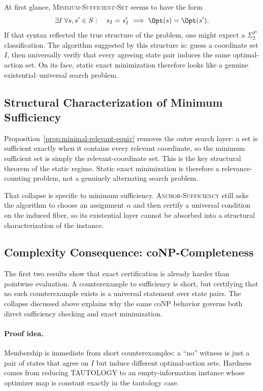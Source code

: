 At first glance, \textsc{Minimum-Sufficient-Set} seems to have the form
\[
\exists I\; \forall s,s'\in S:
\quad s_I=s'_I \implies \Opt(s)=\Opt(s').
\]
If that syntax reflected the true structure of the problem, one might expect a $\Sigma_2^P$ classification. The algorithm suggested by this structure is: guess a coordinate set $I$, then universally verify that every agreeing state pair induces the same optimal-action set. On its face, static exact minimization therefore looks like a genuine existential--universal search problem.

\subsection{Structural Characterization of Minimum Sufficiency}

Proposition~\ref{prop:minimal-relevant-equiv} removes the outer search layer: a set is sufficient exactly when it contains every relevant coordinate, so the minimum sufficient set is simply the relevant-coordinate set. This is the key structural theorem of the static regime. Static exact minimization is therefore a relevance-counting problem, not a genuinely alternating search problem.

That collapse is specific to minimum sufficiency. \textsc{Anchor-Sufficiency} still asks the algorithm to choose an assignment $\alpha$ and then certify a universal condition on the induced fiber, so its existential layer cannot be absorbed into a structural characterization of the instance.

\subsection{Complexity Consequence: coNP-Completeness}

The first two results show that exact certification is already harder than pointwise evaluation. A counterexample to sufficiency is short, but certifying that no such counterexample exists is a universal statement over state pairs. The collapse discussed above explains why the same coNP behavior governs both direct sufficiency checking and exact minimization.

\paragraph{Proof idea.}
Membership is immediate from short counterexamples: a ``no'' witness is just a pair of states that agree on $I$ but induce different optimal-action sets. Hardness comes from reducing TAUTOLOGY to an empty-information instance whose optimizer map is constant exactly in the tautology case.

